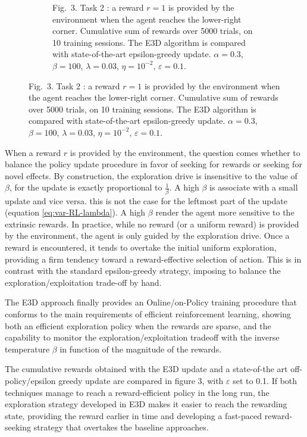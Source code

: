 \documentclass[runningheads]{llncs}
\begin{document}
\begin{figure}[t]
\begin{subfigure}[b]{0.4\textwidth}
		\caption{Fig.~3. Task 2 : a reward $r=1$ is provided by the environment when the agent reaches the lower-right corner. Cumulative sum of rewards over 5000 trials, on 10 training sessions. The E3D algorithm is compared with state-of-the-art epsilon-greedy update. $\alpha=0.3$, $\beta = 100$, $\lambda=0.03$, $\eta=10^{-2}$, $\varepsilon=0.1$.}
	\end{subfigure}
\end{figure}

When a reward $r$ is provided by the environment, the question comes whether to balance the policy update procedure in favor of seeking for rewards or seeking for novel effects. By construction, the exploration drive is insensitive to the value of $\beta$, for the update is exactly proportional to $\frac{1}{\beta}$.  A high $\beta$ is associate with a small update and vice versa. this is not the case for the leftmost part of the update (equation \ref{eq:var-RL-lambda}). A high $\beta$ render the agent more sensitive to the extrinsic rewards. In practice, while no reward (or a uniform reward) is provided by the environment, the agent is only guided by the exploration drive. Once a reward is encountered, it tends to overtake the initial uniform exploration, providing a firm tendency toward a reward-effective selection of action. This is in contrast with the standard epsilon-greedy strategy, imposing to balance the exploration/exploitation trade-off by hand.

The E3D approach finally provides an Online/on-Policy training procedure that conforms to the main requirements of efficient reinforcement learning, showing both an efficient exploration policy when the rewards are sparse, and the capability to monitor the exploration/exploitation tradeoff with the inverse temperature $\beta$ in function of the magnitude of the rewards.

The cumulative rewards obtained with the E3D update and a state-of-the art off-policy/epsilon greedy update are compared in figure 3, %
with $\varepsilon$ set to 0.1. If both techniques manage to reach a reward-efficient policy in the long run, the exploration strategy developed in E3D makes it easier to reach the rewarding state, providing the reward earlier in time and developing a fast-paced reward-seeking strategy that overtakes the baseline approaches.    




\end{document}
